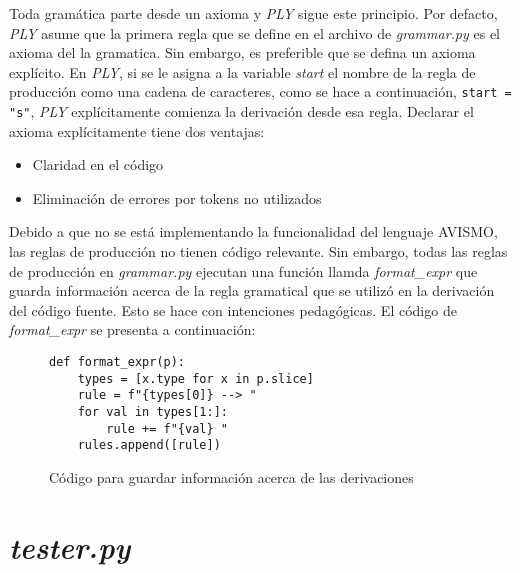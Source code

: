 Toda gramática parte desde un axioma y \textit{PLY} sigue este principio.
Por defacto, \textit{PLY} asume que la primera regla que se define en el archivo de \textit{grammar.py} es el axioma del la gramatica.
Sin embargo, es preferible que se defina un axioma explícito.
En \textit{PLY}, si se le asigna a la variable \textit{start} el nombre de la regla de producción como una cadena de caracteres, como se hace a continuación, \texttt{start = "s"}, \textit{PLY} explícitamente comienza la derivación desde esa regla. Declarar el axioma explícitamente tiene dos ventajas:
\begin{itemize}
	\item Claridad en el código
	\item Eliminación de errores por tokens no utilizados
\end{itemize}

Debido a que no se está implementando la funcionalidad del lenguaje AVISMO, las reglas de producción no tienen código relevante. Sin embargo, todas las reglas de producción en \textit{grammar.py} ejecutan una función llamda \textit{format\_expr} que guarda información acerca de la regla gramatical que se utilizó en la derivación del código fuente.
Esto se hace con intenciones pedagógicas.
El código de \textit{format\_expr} se presenta a continuación:
\begin{figure}[H]
	\begin{verbatim}
def format_expr(p):
    types = [x.type for x in p.slice]
    rule = f"{types[0]} --> "
    for val in types[1:]:
        rule += f"{val} "
    rules.append([rule])
\end{verbatim}
	\caption{Código para guardar información acerca de las derivaciones}
	\label{fig: formatExpr}
\end{figure}

\section{\textit{tester.py}}

